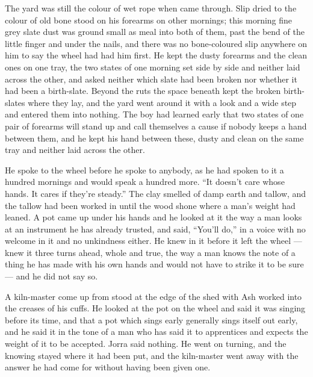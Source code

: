The yard was still the colour of wet rope when  came through. Slip dried to the colour of old bone stood on his forearms on other mornings; this morning fine grey slate dust was ground small as meal into both of them, past the bend of the little finger and under the nails, and there was no bone-coloured slip anywhere on him to say the wheel had had him first. He kept the dusty forearms and the clean ones on one tray, the two states of one morning set side by side and neither laid across the other, and asked neither which slate had been broken nor whether it had been a birth-slate. Beyond the ruts the space beneath  kept the broken birth-slates where they lay, and the yard went around it with a look and a wide step and entered them into nothing. The boy had learned early that two states of one pair of forearms will stand up and call themselves a cause if nobody keeps a hand between them, and he kept his hand between these, dusty and clean on the same tray and neither laid across the other.

He spoke to the wheel before he spoke to anybody, as he had spoken to it a hundred mornings and would speak a hundred more. “It doesn't care whose hands. It cares if they're steady.” The clay smelled of damp earth and tallow, and the tallow had been worked in until the wood shone where a man's weight had leaned. A pot came up under his hands and he looked at it the way a man looks at an instrument he has already trusted, and said, “You'll do,” in a voice with no welcome in it and no unkindness either. He knew  in it before it left the wheel --- knew it three turns ahead, whole and true, the way a man knows the note of a thing he has made with his own hands and would not have to strike it to be sure --- and he did not say so.

A kiln-master come up from  stood at the edge of the shed with Ash worked into the creases of his cuffs. He looked at the pot on the wheel and said it was singing before its time, and that a pot which sings early generally sings itself out early, and he said it in the tone of a man who has said it to apprentices and expects the weight of it to be accepted. Jorra said nothing. He went on turning, and the knowing stayed where it had been put, and the kiln-master went away with the answer he had come for without having been given one.

